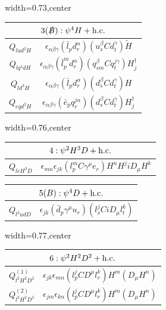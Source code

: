 \begin{table}[H]
\begin{center}
\begin{adjustbox}{width=0.73\textwidth,center}
\begin{minipage}[t]{5.1cm}
\renewcommand{\arraystretch}{1.5}
\begin{tabular}[t]{c|c}
\multicolumn{2}{c}{\boldmath$3(\slashed{B}):\psi^4H+\mathrm{h.c.}$} \\
\hline
$Q_{lud^2H}$  &  $\epsilon_{\alpha\beta\gamma} (\bar{l}_p d_r^\alpha) (u_s^\beta C d_t^\gamma) \widetilde{H} $ \\
$Q_{lq^2dH}$  &  $\epsilon_{\alpha\beta\gamma} (\bar{l}_p^m d_r^\alpha) (q_{sm}^\beta C q_t^{j\gamma}) H^\dag_j $ \\ \hdashline
$Q_{ld^3H}$  &  $\epsilon_{\alpha\beta\gamma} (\bar{l}_p d_r^\alpha) (d_s^\beta C d_t^\gamma) H$ \\
$Q_{eqd^2H}$  &  $\epsilon_{\alpha\beta\gamma} (\bar{e}_p q_r^{j\alpha}) (d_s^\beta C d_t^\gamma) H^\dag_j$
\end{tabular}
\end{minipage}
\end{adjustbox}
%
\begin{adjustbox}{width=0.76\textwidth,center}
\small
%
\begin{minipage}[t]{5.8cm}
\renewcommand{\arraystretch}{1.5}
\begin{tabular}[t]{c|c}
\multicolumn{2}{c}{\boldmath$4:\psi^2H^3D+\mathrm{h.c.}$} \\
\hline
$Q_{leH^3D}$     & $\epsilon_{mn} \epsilon_{jk} (l_p^m C \gamma^\mu e_r) H^n H^j i D_{\mu} H^k$ 
\end{tabular}
\end{minipage}
%
\hspace{1cm}
\begin{minipage}[t]{4.6cm}
\renewcommand{\arraystretch}{1.5}
\begin{tabular}[t]{c|c}
\multicolumn{2}{c}{\boldmath$5(B):\psi^4D+\mathrm{h.c.}$} \\
\hline
$Q_{l^2udD}$    & $\epsilon_{jk} (\bar{d}_p \gamma^\mu u_r) (l_s^j C i D_\mu l_t^k)$ 
\end{tabular}
\end{minipage}
\end{adjustbox}
%
\begin{adjustbox}{width=0.77\textwidth,center}
\small
\begin{minipage}[t]{5.6cm}
\renewcommand{\arraystretch}{1.5}
\begin{tabular}[t]{c|c}
\multicolumn{2}{c}{\boldmath$6:\psi^2H^2D^2+\mathrm{h.c.}$} \\
\hline
$Q_{l^2H^2D^2}^{(1)}$ & $\epsilon_{jk} \epsilon_{mn} (l_p^j C D^{\mu} l_r^k) H^m (D_{\mu} H^n)$ \\
$Q_{l^2H^2D^2}^{(2)}$ & $\epsilon_{jm} \epsilon_{kn} (l_p^j C D^{\mu} l_r^k) H^m (D_{\mu} H^n)$ 

\end{tabular}
\end{minipage}
\end{adjustbox}
\end{center}
\end{table}
